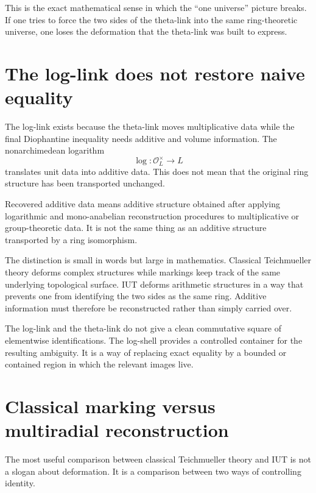 This is the exact mathematical sense in which the ``one universe'' picture breaks.  If one tries to force the two sides of the theta-link into the same ring-theoretic universe, one loses the deformation that the theta-link was built to express.

\section{The log-link does not restore naive equality}

The log-link exists because the theta-link moves multiplicative data while the final Diophantine inequality needs additive and volume information.  The nonarchimedean logarithm
\[
  \log:\mathcal O_L^{\times}\longrightarrow L
\]
translates unit data into additive data.  This does not mean that the original ring structure has been transported unchanged.

\begin{definition}
Recovered additive data means additive structure obtained after applying logarithmic and mono-anabelian reconstruction procedures to multiplicative or group-theoretic data.  It is not the same thing as an additive structure transported by a ring isomorphism.
\end{definition}

The distinction is small in words but large in mathematics.  Classical Teichmueller theory deforms complex structures while markings keep track of the same underlying topological surface.  IUT deforms arithmetic structures in a way that prevents one from identifying the two sides as the same ring.  Additive information must therefore be reconstructed rather than simply carried over.

\begin{remark}
The log-link and the theta-link do not give a clean commutative square of elementwise identifications.  The log-shell provides a controlled container for the resulting ambiguity.  It is a way of replacing exact equality by a bounded or contained region in which the relevant images live.
\end{remark}

\section{Classical marking versus multiradial reconstruction}

The most useful comparison between classical Teichmueller theory and IUT is not a slogan about deformation.  It is a comparison between two ways of controlling identity.


